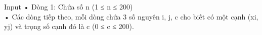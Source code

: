 Input
• Dòng 1: Chứa số n (1 ≤ n ≤ 200)   
\\   • Các dòng tiếp theo, mỗi dòng chứa 3 số nguyên i, j, c cho biết có một cạnh (xi, yj) và trọng số cạnh đó là c (0 ≤ c ≤ 200).